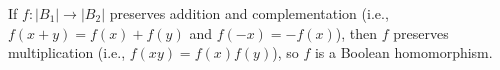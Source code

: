 If $f: |B_1| \rightarrow |B_2|$ preserves addition and complementation (i.e., $f(x + y) = f(x) + f(y)$ and $f(-x) = -f(x)$), then $f$ preserves multiplication (i.e., $f(xy) = f(x)f(y)$), so $f$ is a Boolean homomorphism.
